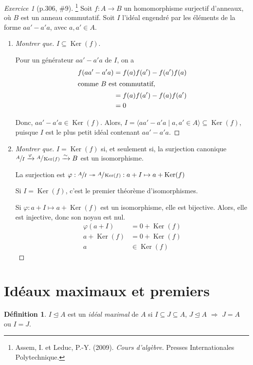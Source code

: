 \documentclass{report}
\theoremstyle{definition}
\newtheorem*{dfn}{D\'efinition}
\theoremstyle{remark}
\newtheorem*{exer}{Exercice}
\def\noyau{\operatorname{Ker}}
\begin{document}
	\begin{exer}[p.306, \#9]\footnote{Assem, I. et Leduc, P.-Y. (2009). \textit{Cours d'algèbre}. Presses Internationales Polytechnique.}
		Soit $f:A\to B$ un homomorphisme surjectif d'anneaux, o\`u $B$ est un anneau commutatif. Soit $I$ l'id\'eal engendr\'e par les \'el\'ements de la forme $aa'-a'a$, avec $a,a'\in A$.
		\begin{enumerate}[label=\alph*)]
			\item \begin{proof}[Montrer que]
				$I\subseteq\noyau(f)$.

				Pour un g\'en\'erateur $aa'-a'a$ de $I$, on a
				\begin{align*}
					f(aa'-a'a)&= f(a)f(a')-f(a')f(a)\\
					\shortintertext{comme $B$ est commutatif,}
					&= f(a)f(a')-f(a)f(a')\\
					&= 0
				\end{align*}

				Donc, $aa'-a'a \in \noyau(f)$. Alors, $I = \langle aa'-a'a \mid a,a'\in A \rangle \subseteq \noyau(f)$, puisque $I$ est le plus petit id\'eal contenant $aa'-a'a$.
			\end{proof}
			\item \begin{proof}[Montrer que]
				$I=\noyau(f)$ si, et seulement si, la surjection canonique $\sfrac{A}{I} \xrightarrow{\varphi} \sfrac{A}{\noyau(f)} \xrightarrow{\sim} B$ est un isomorphisme.

				La surjection est $\varphi : \sfrac{A}{I} \twoheadrightarrow \sfrac{A}{\noyau(f)} : a+I \mapsto a+\noyau(f)$

				Si $I=\noyau(f)$, c'est le premier th\'eor\`eme d'isomorphismes.

				Si $\varphi : a+I \mapsto a+\noyau(f)$ est un isomorphisme, elle est bijective. Alors, elle est injective, donc son noyau est nul.
				\begin{align*}
					\varphi(a+I)&= 0+\noyau(f)\\
					a+\noyau(f)&= 0+\noyau(f)\\
					a&\in \noyau(f)
				\end{align*}
			\end{proof}
		\end{enumerate}
	\end{exer}

	\section{Id\'eaux maximaux et premiers}
	\begin{dfn}
		$I\trianglelefteq A$ est un \emph{id\'eal maximal} de $A$ si $I \subseteq J \subseteq A$, $J\trianglelefteq A$ $\Longrightarrow$ $J=A$ ou $I=J$.
	\end{dfn}
\end{document}
